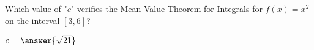 \documentclass{ximera}
\author{Steven Gubkin}
\begin{document}
\begin{exercise}



	Which value of "$c$" verifies the Mean Value Theorem for Integrals for $f(x) = x^2$ on the interval $[3,6]$?

\begin{prompt}
	$c = \answer{\sqrt{21}}$
\end{prompt}

\end{exercise}
\end{document}
